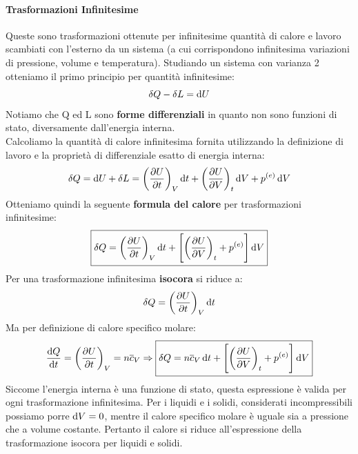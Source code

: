 \documentclass{article}
\newcommand{\then}{\ensuremath{\Rightarrow}}
\begin{document}
\paragraph{Trasformazioni Infinitesime}
Queste sono trasformazioni ottenute per infinitesime quantità di calore e lavoro scambiati con l'esterno da un sistema (a cui corrispondono infinitesima variazioni di pressione, volume e temperatura). Studiando un sistema con varianza 2 otteniamo il primo principio per quantità infinitesime:
\[\delta Q-\delta L=\dif U\]
Notiamo che Q ed L sono \textbf{forme differenziali} in quanto non sono funzioni di stato, diversamente dall'energia interna.\\ Calcoliamo la quantità di calore infinitesima fornita utilizzando la definizione di lavoro e la proprietà di differenziale esatto di energia interna:
\[\delta Q=\dif U+\delta L=\left(\pdv{U}{t}\right)_V\dif t+\left(\pdv{U}{V}\right)_t\dif V+p^{(e)}\dif V\]
Otteniamo quindi la seguente \textbf{formula del calore} per trasformazioni infinitesime:
\begin{equation}
\boxed{\delta Q=\left(\pdv{U}{t}\right)_V\dif t+\left[\left(\pdv{U}{V}\right)_t+p^{(e)}\right]\dif V}
\end{equation}
Per una trasformazione infinitesima \textbf{isocora} si riduce a:
\[\delta Q=\left(\pdv{U}{t}\right)_V\dif t\]
Ma per definizione di calore specifico molare:
\[\dv{Q}{t}=\left(\pdv{U}{t}\right)_V=n\overline{c}_V\then \boxed{\delta Q=n\overline{c}_V\dif t+\left[\left(\pdv{U}{V}\right)_t+p^{(e)}\right]\dif V}\]
Siccome l'energia interna è una funzione di stato, questa espressione è valida per ogni trasformazione infinitesima.
Per i liquidi e i solidi, considerati incompressibili possiamo porre $\dif V=0$, mentre il calore specifico molare è uguale sia a pressione che a volume costante. Pertanto il calore si riduce all'espressione della trasformazione isocora per liquidi e solidi.
\end{document}
